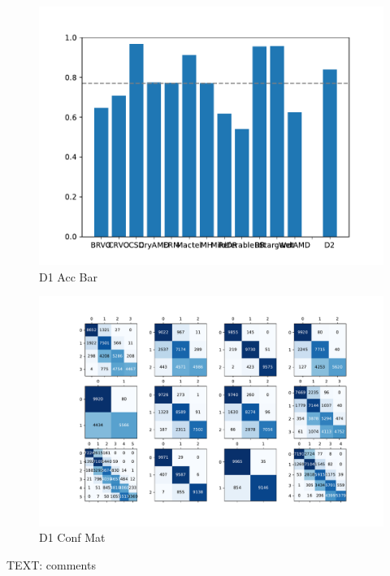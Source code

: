 \documentclass{article}
\begin{document}
	\begin{figure}[htbp]
		\centering
		\includegraphics[width=\linewidth]{Figs/diagnosis1_acc_barchart.pdf}
		\caption{D1 Acc Bar}
		\vspace{0.3cm}
		\label{fig:D1_acc_bar}
	\end{figure}
	
	\begin{figure}[htbp]
		\centering
		\includegraphics[width=\linewidth]{Figs/diagnosis1_confusion_matrix.pdf}
		\caption{D1 Conf Mat}
		\vspace{0.3cm}
		\label{fig:D1_conf_mat}
	\end{figure}
	TEXT: comments
	
\end{document}
